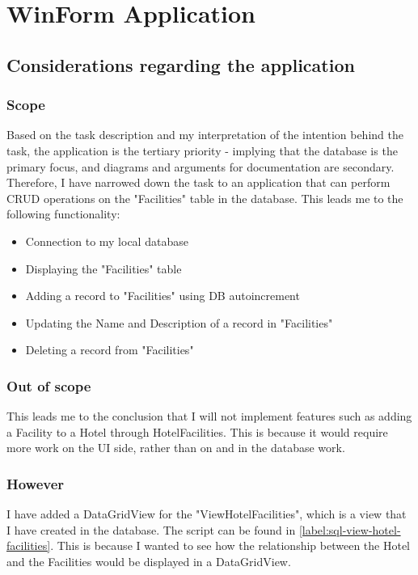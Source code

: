 \chapter{WinForm Application}
\label{chapter:winform-application}

\section{Considerations regarding the application}

\subsection{Scope}
Based on the task description and my interpretation of the intention behind the task, the application is the tertiary priority - implying that the database is the primary focus, and diagrams and arguments for documentation are secondary.
Therefore, I have narrowed down the task to an application that can perform CRUD operations on the "Facilities" table in the database. This leads me to the following functionality:

\begin{itemize}
    \item Connection to my local database
    \item Displaying the "Facilities" table
    \item Adding a record to "Facilities" using DB autoincrement
    \item Updating the Name and Description of a record in "Facilities"
    \item Deleting a record from "Facilities"
\end{itemize}

\subsection{Out of scope}
This leads me to the conclusion that I will not implement features such as adding a Facility to a Hotel through HotelFacilities. 
This is because it would require more work on the UI side, rather than on and in the database work.

\subsection{However}
I have added a DataGridView for the "ViewHotelFacilities", which is a view that I have created in the database.
The script can be found in \ref*{label:sql-view-hotel-facilities}. 
This is because I wanted to see how the relationship between the Hotel and the Facilities would be displayed in a DataGridView.

